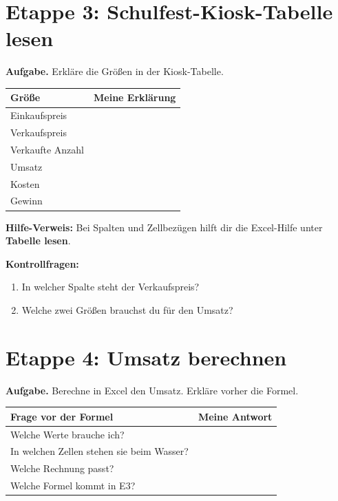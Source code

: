 \section*{Etappe 3: Schulfest-Kiosk-Tabelle lesen}
\begin{boxHinweis}
\textbf{Aufgabe.} Erkläre die Größen in der Kiosk-Tabelle.
\end{boxHinweis}
\begin{tabularx}{\textwidth}{|L{4cm}|Y|}
\hline
{}\textbf{Größe} & \textbf{Meine Erklärung}\\\hline
Einkaufspreis & \\\hline
Verkaufspreis & \\\hline
Verkaufte Anzahl & \\\hline
Umsatz & \\\hline
Kosten & \\\hline
Gewinn & \\\hline
\end{tabularx}

\begin{boxTipp}
\textbf{Hilfe-Verweis:} Bei Spalten und Zellbezügen hilft dir die Excel-Hilfe unter \textbf{Tabelle lesen}.
\end{boxTipp}

\textbf{Kontrollfragen:}
\begin{enumerate}[label=\alph*)]
\item In welcher Spalte steht der Verkaufspreis? \antwortfeld[2cm]
\item Welche zwei Größen brauchst du für den Umsatz? \linie[7cm]
\end{enumerate}

\medskip
\section*{Etappe 4: Umsatz berechnen}
\begin{boxHinweis}
\textbf{Aufgabe.} Berechne in Excel den Umsatz. Erkläre vorher die Formel.
\end{boxHinweis}

\begin{tabularx}{\textwidth}{|L{5cm}|Y|}
\hline
{}\textbf{Frage vor der Formel} & \textbf{Meine Antwort}\\\hline
Welche Werte brauche ich? & \\\hline
In welchen Zellen stehen sie beim Wasser? & \\\hline
Welche Rechnung passt? & \\\hline
Welche Formel kommt in E3? & \\\hline
\end{tabularx}

